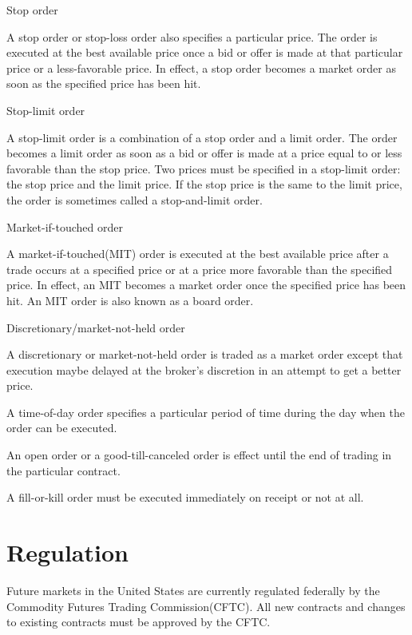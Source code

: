 \documentclass{article}
\begin{document}
Stop order

A stop order or stop-loss order also specifies a particular price. The order is executed at the best available price once a bid or offer is made at that particular price or a less-favorable price. In effect, a stop order becomes a market order as soon as the specified price has been hit.
\\ \hspace*{\fill}

Stop-limit order

A stop-limit order is a combination of a stop order and a limit order. The order becomes a limit order as soon as a bid or offer is made at a price equal to or less favorable than the stop price. Two prices must be specified in a stop-limit order: the stop price and the limit price. If the stop price is the same to the limit price, the order is sometimes called a stop-and-limit order.
\\ \hspace*{\fill}

Market-if-touched order

A market-if-touched(MIT) order is executed at the best available price after a trade occurs at a specified price or at a price more favorable than the specified price. In effect, an MIT becomes a market order once the specified price has been hit. An MIT order is also known as a board order.
\\ \hspace*{\fill}

Discretionary/market-not-held order

A discretionary or market-not-held order is traded as a market order except that execution maybe delayed at the broker's discretion in an attempt to get a better price.
\\ \hspace*{\fill}

A time-of-day order specifies a particular period of time during the day when the order can be executed.

An open order or a good-till-canceled order is effect until the end of trading in the particular contract.

A fill-or-kill order must be executed immediately on receipt or not at all.

\section{Regulation}
Future markets in the United States are currently regulated federally by the Commodity Futures Trading Commission(CFTC). All new contracts and changes to existing contracts must be approved by the CFTC. 
\end{document}
